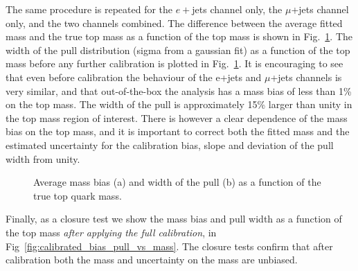 The same procedure is repeated for the $e+$jets channel only, the $\mu$+jets channel only, and the two channels
combined. The difference between the average fitted mass and the true top mass as a function of the top mass is shown in
Fig.~\ref{fig:bias_pull_vs_mass}. The width of the pull distribution (sigma from a gaussian fit) as a function of the
top mass before any further calibration is plotted in Fig.~\ref{fig:bias_pull_vs_mass}. It is encouraging to see that
even before calibration the behaviour of the e+jets and $\mu$+jets channels is very similar, and that out-of-the-box the
analysis has a mass bias of less than 1\% on the top mass. The width of the pull is approximately 15\% larger than unity
in the top mass region of interest. There is however a clear dependence of the mass bias on the top mass, and it is
important to correct both the fitted mass and the estimated uncertainty for the calibration bias, slope and deviation of
the pull width from unity.

\begin{figure}[!htp]
   \hspace{-1.cm}
   \caption{Average mass bias (a) and width of the pull (b) as a function of the true top quark mass.
   \label{fig:bias_pull_vs_mass}}
\end{figure}
 
Finally, as a closure test we show the mass bias and pull width as a function of the top mass {\em after applying the
full calibration}, in Fig~\ref{fig:calibrated_bias_pull_vs_mass}. The closure tests confirm that after calibration both
the mass and uncertainty on the mass are unbiased.


